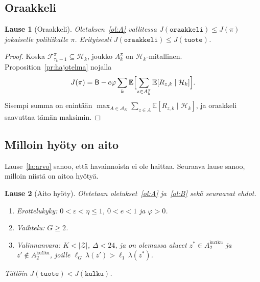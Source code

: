 \documentclass[11pt,a4paper]{article}
\theoremstyle{plain}
\newtheorem{lause}{Lause}
\theoremstyle{definition}
\theoremstyle{remark}
\newcommand{\E}{\mathbb{E}}
\newcommand{\cZ}{\mathcal{Z}}
\newcommand{\cF}{\mathcal{F}}
\newcommand{\cH}{\mathcal{H}}
\newcommand{\cA}{\mathcal{A}}
\newcommand{\1}{\mathbf{1}}
\newcommand{\pol}[1]{\texttt{#1}}
\begin{document}
\subsection{Oraakkeli}

\begin{lause}[Oraakkeli]\label{la:oraakkeli}
Oletuksen~\ref{ol:A} vallitessa $J(\pol{oraakkeli}) \le J(\pi)$ jokaiselle
politiikalle $\pi$. Erityisesti $J(\pol{oraakkeli}) \le J(\pol{tuote})$.
\end{lause}

\begin{proof}
Koska $\cF^\pi_{\tau_k - 1} \subseteq \cH_k$, joukko $A^\pi_k$ on
$\cH_k$-mitallinen. Proposition~\ref{pr:hajotelma} nojalla
\[
  J(\pi) = \mathsf{B} - e\varphi\sum_k \E\Bigl[\sum_{z \in A^\pi_k}\E[R_{z,k}\mid\cH_k]\Bigr].
\]
Sisempi summa on enintään
$\max_{A \in \cA_K}\sum_{z \in A}\E[R_{z,k}\mid\cH_k]$, ja oraakkeli saavuttaa
tämän maksimin.
\end{proof}

\subsection{Milloin hyöty on aito}

Lause~\ref{la:arvo} sanoo, että havainnoista ei ole haittaa. Seuraava lause
sanoo, milloin niistä on aitoa hyötyä.

\begin{lause}[Aito hyöty]\label{la:aito}
Oletetaan oletukset~\ref{ol:A} ja~\ref{ol:B} sekä seuraavat ehdot.
\begin{enumerate}[label=(C\arabic*),leftmargin=3.2em]
  \item \emph{Erottelukyky:} $0 < \varepsilon < \eta \le 1$, $0 < e < 1$ ja $\varphi > 0$.
  \item \emph{Vaihtelu:} $G \ge 2$.
  \item \emph{Valinnanvara:} $K < |\cZ|$, $\Delta < 24$, ja on olemassa alueet
  $z^\ast \in A^{\pol{kulku}}_2$ ja $z' \notin A^{\pol{kulku}}_2$, joille
  $\ell_G\, \lambda(z') > \ell_1\, \lambda(z^\ast)$.
\end{enumerate}
Tällöin $J(\pol{tuote}) < J(\pol{kulku})$.
\end{lause}
\end{document}
